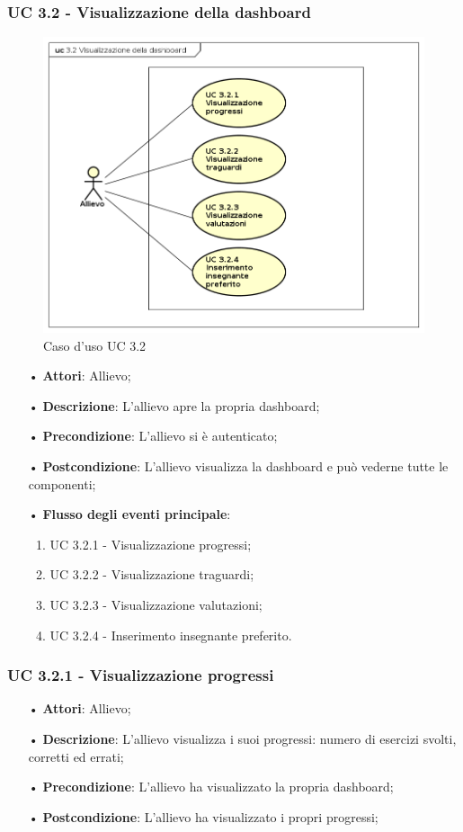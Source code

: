 \subsubsection{UC 3.2 - Visualizzazione della {dashboard}}
\begin{figure}[H]
\centering
\includegraphics[width=17cm]{img/UC32.png} 
\caption{Caso d'uso UC 3.2}\label{fig:32}
\end{figure}
\begin{itemize}
\item[•]\textbf{Attori}: Allievo;
\item[•]\textbf{Descrizione}: L'allievo apre la propria {dashboard};
\item[•]\textbf{Precondizione}: L'allievo si è autenticato;
\item[•]\textbf{Postcondizione}: L'allievo visualizza la {dashboard} e può vederne tutte le componenti;
\item[•]\textbf{Flusso degli eventi principale}:
\begin{enumerate}
\item UC 3.2.1 - Visualizzazione progressi;
\item UC 3.2.2 - Visualizzazione traguardi;
\item UC 3.2.3 - Visualizzazione valutazioni;
\item UC 3.2.4 - Inserimento insegnante preferito.
\end{enumerate}
\end{itemize}

\subsubsection{UC 3.2.1 - Visualizzazione progressi}
\begin{itemize}
\item[•]\textbf{Attori}: Allievo;
\item[•]\textbf{Descrizione}: L'allievo visualizza i suoi progressi: numero di esercizi svolti, corretti ed errati;
\item[•]\textbf{Precondizione}: L'allievo ha visualizzato la propria {dashboard};
\item[•]\textbf{Postcondizione}: L'allievo ha visualizzato i propri progressi;
\end{itemize}

